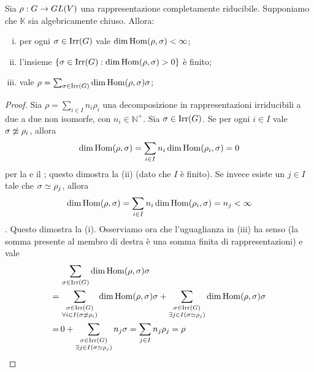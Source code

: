\begin{proposition}
Sia $\rho:G\to GL(V)$ una rappresentazione completamente riducibile. Supponiamo che $\mathbb{K}$ sia algebricamente chiuso. Allora:
\begin{enumerate}[(i)]
\item per ogni $\sigma\in\operatorname{Irr}(G)$ vale $\dim\operatorname{Hom}(\rho,\sigma)<\infty$;
\item l'insieme $\{\sigma\in\operatorname{Irr}(G):\dim\operatorname{Hom}(\rho,\sigma)>0\}$ è finito;
\item vale $\rho=\sum_{\sigma\in\operatorname{Irr}(G)}\dim\operatorname{Hom}(\rho,\sigma)\sigma$;
\end{enumerate}
\end{proposition}
\begin{proof}
Sia $\rho=\sum_{i\in I}n_i\rho_i$ una decomposizione in rappresentazioni irriducibili a due a due non isomorfe, con $n_i\in\mathbb{N^+}$. Sia $\sigma\in\operatorname{Irr}(G)$. Se per ogni $i\in I$ vale $\sigma\not\simeq\rho_i$, allora
$$
\dim\operatorname{Hom}(\rho,\sigma)=\sum_{i\in I}n_i\dim\operatorname{Hom}(\rho_i,\sigma)=0
$$
per la  e il ; questo dimostra la (ii) (dato che $I$ è finito). Se invece esiste un $j\in I$ tale che $\sigma\simeq\rho_j$, allora
$$
\dim\operatorname{Hom}(\rho,\sigma)=\sum_{i\in I}n_i\dim\operatorname{Hom}(\rho_i,\sigma)=n_j<\infty
$$
. Questo dimostra la (i). Osserviamo ora che l'uguaglianza in (iii) ha senso (la somma presente al membro di destra è una somma finita di rappresentazioni) e vale
\begin{align*}
&\sum_{\sigma\in\operatorname{Irr}(G)}\dim\operatorname{Hom}(\rho,\sigma)\sigma\\
=\,&\sum_{\substack{\sigma\in\operatorname{Irr}(G)\\\forall i\in I(\sigma\not\simeq\rho_i)}}\dim\operatorname{Hom}(\rho,\sigma)\sigma+\sum_{\substack{\sigma\in\operatorname{Irr}(G)\\\exists j\in I(\sigma\simeq\rho_j)}}\dim\operatorname{Hom}(\rho,\sigma)\sigma\\
=\,&0+\sum_{\substack{\sigma\in\operatorname{Irr}(G)\\\exists j\in I(\sigma\simeq\rho_j)}}n_j\sigma=\sum_{j\in I}n_j\rho_j=\rho
\end{align*}
\end{proof}

